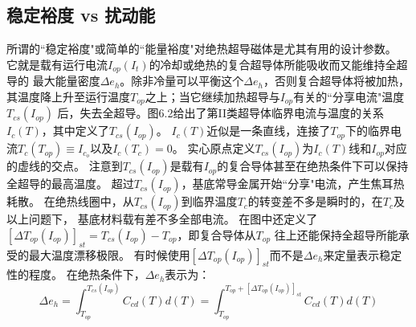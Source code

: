 \subsection{稳定裕度 vs 扰动能}
所谓的``稳定裕度"或简单的``能量裕度"对绝热超导磁体是尤其有用的设计参数。
它就是载有运行电流$I_{op}(I_t)$的冷却或绝热的复合超导体所能吸收而又能维持全超导的
最大能量密度$\Delta e_h$。除非冷量可以平衡这个$\Delta e_h$，否则复合超导体将被加热，
其温度降上升至运行温度$T_{op}$之上；当它继续加热超导与$I_{op}$有关的``分享电流"温度$T_{cs}(I_{op})$
后，失去全超导。图6.2给出了第II类超导体临界电流与温度的关系$I_c(T)$，其中定义了$T_{cs}(I_{op})$。
$I_c(T)$近似是一条直线，连接了$T_{op}$下的临界电流$T_c(T_{op})\equiv I_{c_o}$以及$I_c(T_c)=0$。
实心原点定义$T_{cs}(I_{op})$为$I_c(T)$线和$I_{op}$对应的虚线的交点。
注意到$T_{cs}(I_{op})$是载有$I_{op}$的复合导体甚至在绝热条件下可以保持全超导的最高温度。
超过$T_{cs}(I_{op})$，基底常导金属开始``分享"电流，产生焦耳热耗散。
在绝热线圈中，从$T_{cs}(I_{op})$到临界温度$T_c$的转变差不多是瞬时的，在$T_c$及以上问题下，
基底材料载有差不多全部电流。
在图中还定义了$[\Delta T_{op}(I_{op})]_{st}=T_{cs}(I_{op})-T_{op}$，即复合导体从$T_{op}$
往上还能保持全超导所能承受的最大温度漂移极限。
有时候使用$[\Delta T_{op}(I_{op})]_{st}$而不是$\Delta e_h$来定量表示稳定性的程度。
在绝热条件下，$\Delta e_h$表示为： 
\begin{equation}%
\Delta e_h=\int_{T_{op}}^{T_{cs}(I_{op})}{C_{cd}(T)d(T)}=\int_{T_{op}}^{T_{op}+[\Delta T_{op}(I_{op})]_{st}}{C_{cd}(T)d(T)}
\end{equation}

